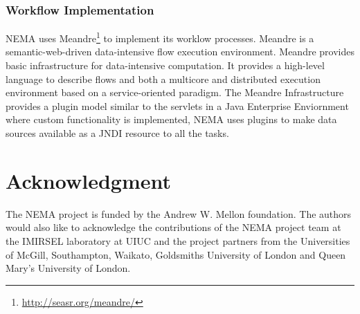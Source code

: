 \documentclass[conference]{IEEEtran}
\begin{document}
\subsubsection{Workflow Implementation}
NEMA uses Meandre\footnote{\url{http://seasr.org/meandre/}} to implement its worklow processes. Meandre is a semantic-web-driven data-intensive flow execution environment. Meandre provides basic infrastructure for data-intensive computation. It provides a high-level language to describe flows and both a multicore and distributed execution environment based on a service-oriented paradigm. The Meandre Infrastructure provides a plugin model similar to the servlets in a Java Enterprise Enviornment where custom functionality is implemented, NEMA uses plugins to make data sources available as a JNDI \cite{lee2000jndi} resource to all the tasks.
%
%
%

\section*{Acknowledgment}
The NEMA project is funded by the Andrew W. Mellon foundation. The authors would also like to acknowledge the contributions of the NEMA project team at the IMIRSEL laboratory at UIUC and the project partners from the Universities of McGill, Southampton, Waikato, Goldsmiths University of London and Queen Mary's University of London.
\end{document}
